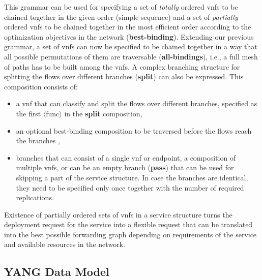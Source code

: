 \documentclass{sig-alternate-per}
\begin{document}
This grammar can be used for specifying a set of
\emph{totally} ordered \acp{vnf} to be chained together in the given order (simple sequence) and
a set of \emph{partially} ordered \acp{vnf} to be chained together in the most
efficient order according to the optimization objectives in the network (\textbf{best-binding}).
Extending our previous grammar, a set of \acp{vnf} can now be specified to be
chained together in a way that all possible 
permutations of them are traversable (\textbf{all-bindings}), i.e., a full mesh of
paths has to be built among the \acp{vnf}.
A complex branching structure for splitting the flows over different 
branches (\textbf{split}) can also be expressed. This composition consists of:
\begin{itemize}[noitemsep]
 \item a \ac{vnf} that can classify and split the flows over different branches,
 specified as the first $\langle\text{func}\rangle$ in the \textbf{split} composition,
 \item an optional best-binding composition to be traversed before the flows 
 reach the branches \cite{mehraghdam2014specifying},
 \item branches that can consist of a single \ac{vnf} or endpoint, a composition 
 of multiple \acp{vnf}, or can be an empty branch (\textbf{pass}) that can be used for
 skipping a part of the service structure. In case the branches are identical, 
 they need to be specified only once together with the number of required replications. 
\end{itemize}

Existence of partially ordered sets of \acp{vnf} in a service structure turns the
deployment request for the service into a flexible request that can be translated
into the best possible forwarding graph depending on requirements of the service
and available resources in the network.


\subsection{YANG Data Model}
\label{subsec:yang}
\end{document}
